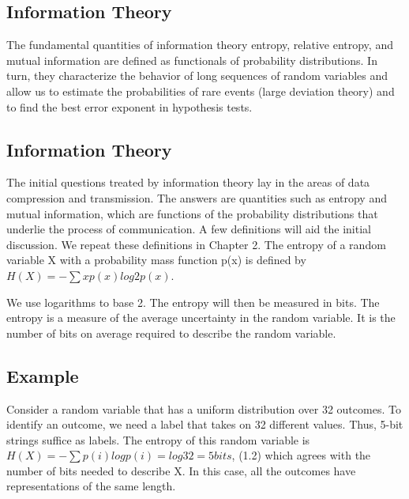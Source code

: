 
\subsection{Information Theory}

The fundamental quantities of information theory entropy, relative
entropy, and mutual information are defined as functionals of
probability distributions. In turn, they characterize the behavior
of long sequences of random variables and allow us to estimate the
probabilities of rare events (large deviation theory) and to find
the best error exponent in hypothesis tests.



\subsection{Information Theory}

The initial questions treated by information theory lay in the
areas of data compression and transmission. The answers are
quantities such as entropy and mutual information, which are
functions of the probability distributions that underlie the
process of communication. A few definitions will aid the initial
discussion. We repeat these definitions in Chapter 2. The entropy
of a random variable X with a probability mass function p(x) is
defined by $H(X) = -\sum x p(x) log2 p(x)$. 




We use logarithms to base 2. The entropy will then be measured in
bits. The entropy is a measure of the average uncertainty in the
random variable. It is the number of bits on average required to
describe the random variable.



\subsection{Example}Consider a random variable that has a
uniform distribution over 32 outcomes. To identify an outcome, we
need a label that takes on 32 different values. Thus, 5-bit
strings suffice as labels. The entropy of this random variable is
$H(X) = - \sum p(i) log p(i) = log 32 = 5 bits$, (1.2) which
agrees with the number of bits needed to describe X. In this case,
all the outcomes have representations of the same length.






